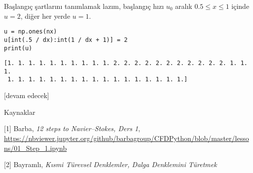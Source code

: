 \documentclass[12pt,fleqn]{article}\usepackage{../../common}
\begin{document}
Başlangıç şartlarını tanımlamak lazım, başlangıç hızı $u_0$ aralık
$0.5 \leq x \leq 1$ içinde $u = 2$, diğer her yerde $u = 1$.


\begin{verbatim}
u = np.ones(nx)
u[int(.5 / dx):int(1 / dx + 1)] = 2  
print(u)
\end{verbatim}

\begin{verbatim}
[1. 1. 1. 1. 1. 1. 1. 1. 1. 1. 2. 2. 2. 2. 2. 2. 2. 2. 2. 2. 2. 1. 1. 1.
 1. 1. 1. 1. 1. 1. 1. 1. 1. 1. 1. 1. 1. 1. 1. 1. 1.]
\end{verbatim}






















[devam edecek]

Kaynaklar

[1] Barba, {\em 12 steps to Navier–Stokes, Ders 1},
    \url{https://nbviewer.jupyter.org/github/barbagroup/CFDPython/blob/master/lessons/01_Step_1.ipynb}

[2] Bayramlı, {\em Kısmi Türevsel Denklemler, Dalga Denklemini Türetmek}
\end{document}
